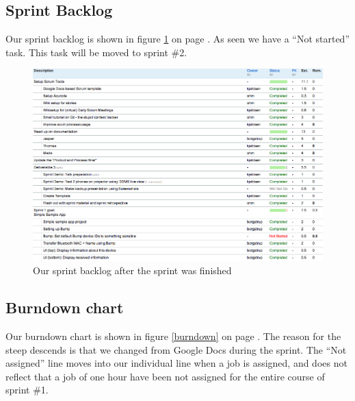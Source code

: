 \documentclass[a4paper,11pt]{article}
\begin{document}
\subsection{Sprint Backlog}
Our sprint backlog is shown in figure \ref{sprintbacklog} on page \pageref{sprintbacklog}.
As seen we have a ``Not started'' task. 
This task will be moved to sprint \#2.

\begin{figure}[ht!]
	\begin{center}
	\includegraphics[width=1.4\textwidth, angle=-90]{sprintbacklog.png}		
	\end{center}
	\caption{Our sprint backlog after the sprint was finished}
	\label{sprintbacklog}
\end{figure}

\subsection{Burndown chart}

Our burndown chart is shown in figure \ref{burndown} on page \pageref{burndown}.
The reason for the steep descends is that we changed from Google Docs during the sprint.
The ``Not assigned'' line moves into our individual line when a job is assigned, and does not reflect that a job of one hour have been not assigned for the entire course of sprint \#1.
\end{document}
